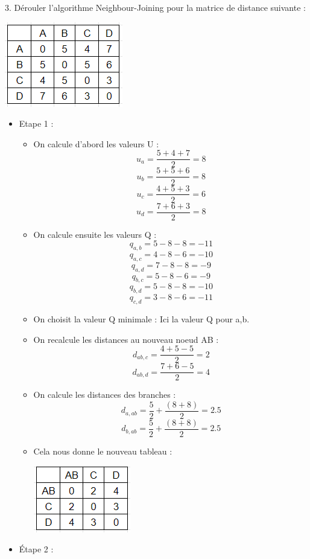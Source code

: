 \documentclass[
	12pt, %
]{fphw}
\begin{document}
\begin{problem}
	3. Dérouler l'algorithme Neighbour-Joining pour la matrice de distance suivante :
\begin{center}
	\includegraphics[width=0.3\columnwidth]{mat1.png}
\end{center}
\end{problem}
\begin{center}
\begin{itemize}
		\item Etape 1 :
			\begin{itemize}
			\item On calcule d'abord les valeurs U :
				\[ u_{a} = \frac{5+4+7}{2} = 8 \]
				\[ u_{b} = \frac{5+5+6}{2} = 8 \]
				\[ u_{c} = \frac{4+5+3}{2} = 6 \]
				\[ u_{d} = \frac{7+6+3}{2} = 8 \]
			\item On calcule ensuite les valeurs Q :
				\[ q_{a,b} = 5-8-8 = -11 \]
				\[ q_{a,c} = 4-8-6 = -10 \]
				\[ q_{a,d} = 7-8-8 = -9 \]
				\[ q_{b,c} = 5-8-6 = -9 \]
				\[ q_{b,d} = 5-8-8 = -10 \]
				\[ q_{c,d} = 3-8-6 = -11 \]
			\item On choisit la valeur Q minimale : Ici la valeur Q pour a,b.
			\item On recalcule les distances au nouveau noeud AB :
				\[ d_{ab,c} = \frac{4+5-5}{2} = 2 \]
				\[ d_{ab,d} = \frac{7+6-5}{2} = 4 \]	
			\item On calcule les distances des branches :
				\[ d_{a,ab} = \frac{5}{2} + \frac{(8+8)}{2} = 2.5 \]
				\[ d_{b,ab} = \frac{5}{2} + \frac{(8+8)}{2} = 2.5 \]
			\item Cela nous donne le nouveau tableau :
				\begin{center}
					\includegraphics[width=0.27\columnwidth]{mat2.png} 
				\end{center}
			\end{itemize}
		\item Étape 2 :
			\begin{itemize}

\end{itemize}
\end{itemize}
\end{center}
\end{document}
